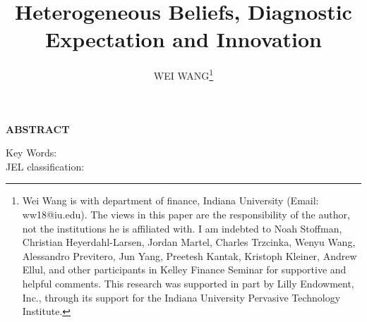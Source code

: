 \documentclass[11pt]{article}
\begin{document}
\onehalfspacing      %
\renewcommand{\footnote}{\endnote}  %

\author{WEI WANG\thanks{\rm Wei Wang is with department of finance, Indiana University (Email: ww18@iu.edu). The views in this paper are the responsibility of the author, not the institutions he is affiliated with. I am indebted to Noah Stoffman, Christian Heyerdahl-Larsen, Jordan Martel, Charles Trzcinka, Wenyu Wang, Alessandro Previtero, Jun Yang, Preetesh Kantak, Kristoph Kleiner, Andrew Ellul, and other participants in Kelley Finance Seminar for supportive and helpful comments. This research was supported in part by Lilly Endowment, Inc., through its support for the Indiana University Pervasive Technology Institute.}}


\title{\Large \bf Heterogeneous Beliefs, Diagnostic Expectation and Innovation}

\date{}              %


\maketitle
\thispagestyle{empty}

\bigskip

\centerline{\bf ABSTRACT}



\begin{doublespace}  %
  \noindent  
\end{doublespace}


\medskip
\noindent Key Words:  \\
\noindent JEL classification: 

\clearpage


\noindent 




\begin{doublespacing}   %


\end{doublespacing}

\clearpage
\end{document}
